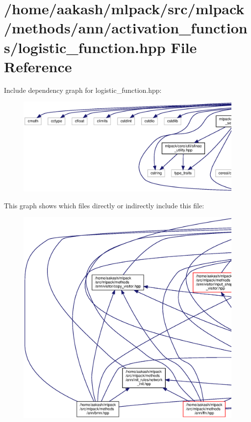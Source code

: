 \section{/home/aakash/mlpack/src/mlpack/methods/ann/activation\+\_\+functions/logistic\+\_\+function.hpp File Reference}
\label{logistic__function_8hpp}
Include dependency graph for logistic\+\_\+function.\+hpp\+:
\nopagebreak
\begin{figure}[H]
\begin{center}
\leavevmode
\includegraphics[width=350pt]{logistic__function_8hpp__incl}
\end{center}
\end{figure}
This graph shows which files directly or indirectly include this file\+:
\nopagebreak
\begin{figure}[H]
\begin{center}
\leavevmode
\includegraphics[width=350pt]{logistic__function_8hpp__dep__incl}
\end{center}
\end{figure}
